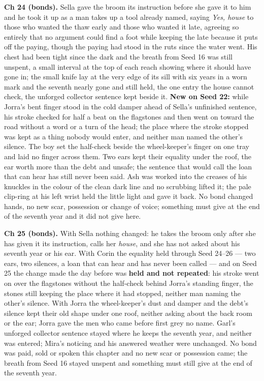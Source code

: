 \documentclass{design/chronicle}
\begin{document}
{\textbf{Ch 24 (bonds).} Sella gave the broom its instruction before she gave it to him and he took it up as a man takes up a tool already named, saying \emph{Yes, house} to those who wanted the thaw early and those who wanted it late, agreeing so entirely that no argument could find a foot while keeping the late because it puts off the paying, though the paying had stood in the ruts since the water went. His chest had been tight since the dark and the breath from Seed 16 was still unspent, a small interval at the top of each reach showing where it should have gone in; the small knife lay at the very edge of its sill with six years in a worn mark and the seventh nearly gone and still held, the one entry the house cannot check, the unforged collector sentence kept beside it. \textbf{New on Seed 22:} while Jorra’s bent finger stood in the cold damper ahead of Sella’s unfinished sentence, his stroke checked for half a beat on the flagstones and then went on toward the road without a word or a turn of the head; the place where the stroke stopped was kept as a thing nobody would enter, and neither man named the other’s silence. The boy set the half-check beside the wheel-keeper’s finger on one tray and laid no finger across them. Two ears kept their equality under the roof, the ear worth more than the debt and unsafe; the sentence that would call the loan that can hear has still never been said. Ash was worked into the creases of his knuckles in the colour of the clean dark line and no scrubbing lifted it; the pale clip-ring at his left wrist held the little light and gave it back. No bond changed hands, no new scar, possession or change of voice; something must give at the end of the seventh year and it did not give here.

\textbf{Ch 25 (bonds).} With Sella nothing changed: he takes the broom only after she has given it its instruction, calls her \emph{house}, and she has not asked about his seventh year or his ear. With Corin the equality held through Seed 24–26 — two ears, two silences, a loan that can hear and has never been called — and on Seed 25 the change made the day before was \textbf{held and not repeated}: his stroke went on over the flagstones without the half-check behind Jorra’s standing finger, the stones still keeping the place where it had stopped, neither man naming the other’s silence. With Jorra the wheel-keeper’s dust and damper and the debt’s silence kept their old shape under one roof, neither asking about the back room or the ear; Jorra gave the men who came before first grey no name. Garl’s unforged collector sentence stayed where he keeps the seventh year, and neither was entered; Mira’s noticing and his answered weather were unchanged. No bond was paid, sold or spoken this chapter and no new scar or possession came; the breath from Seed 16 stayed unspent and something must still give at the end of the seventh year.

}
\end{document}
